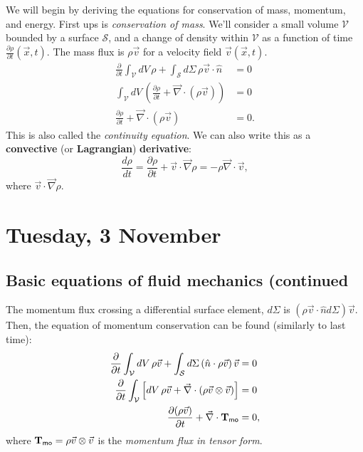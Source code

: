 \documentclass{tufte-handout}
\renewcommand{\textbf}[1]{{\bf \textcolor{dark-gray}{#1}}}
\renewcommand{\rm}{\sf}
\begin{document}
We will begin by deriving the equations for conservation of mass, momentum, and energy. First ups is \textit{conservation of mass}. We'll consider a small volume $\mathcal V$ bounded by a surface $\mathcal S$, and a change of density within $\mathcal V$ as a function of time $\frac{\partial \rho}{\partial t}(\vec x,t)$. The mass flux is $\rho \vec v$ for a velocity field $\vec v(\vec x,t)$.
\begin{align}
\label{eq:continuity}
\frac{\partial}{\partial t} \int_{\mathcal V} dV\, \rho + \int_{\mathcal S} d\Sigma\, \rho \vec v \cdot \hat n &= 0\nonumber \\
\int_{\mathcal V} dV\, \left (\frac{\partial \rho}{\partial t} + \vec \nabla \cdot (\rho \vec v)\right ) &= 0 \nonumber \\
\frac{\partial \rho}{\partial t} + \vec \nabla \cdot (\rho \vec v) &=0.
\end{align}
This is also called the \textit{continuity equation}. We can also write this as a \textbf{convective} (or \textbf{Lagrangian}) \textbf{derivative}:
\begin{equation}
\frac{d\rho}{dt} = \frac{\partial \rho}{\partial t} + \vec v \cdot \vec \nabla \rho = -\rho \vec \nabla \cdot\vec v,
\end{equation}
where $\vec v \cdot \vec \nabla \rho$.


\section{Tuesday, 3 November}
\subsection{Basic equations of fluid mechanics (continued}
The momentum flux crossing a differential surface element, $d\Sigma$ is $(\rho \vec v \cdot \hat n d\Sigma)\vec v$. Then, the equation of momentum conservation can be found (similarly to last time):
\begin{align}
\frac{\partial}{\partial t}\int_{\mathcal V} dV\, \rho \vec v + \int_{\mathcal S} d\Sigma \left (\hat n \cdot \rho \vec v\right ) \vec v &= 0 \nonumber\\
\frac{\partial}{\partial t} \int_{\mathcal V} \left [dV \, \rho \vec v +  \vec \nabla \cdot \left (\rho \vec v \otimes \vec v \right )\right ] &= 0 \nonumber\\
\frac{\partial (\rho \vec v)}{\partial t} + \vec \nabla \cdot  \mathbf{T_{\rm mo}} &= 0,
\end{align}
where $\mathbf{T_{\rm mo}} = \rho \vec v \otimes \vec v$ is the \textit{momentum flux in tensor form}. 
\end{document}
